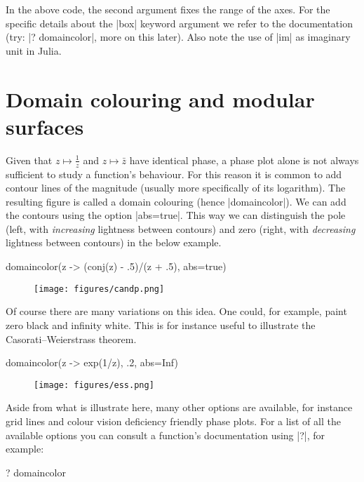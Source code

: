 \documentclass[a4paper]{article}
\begin{document}
In the above code, the second argument fixes the range of the axes. For the
specific details about the \jlv|box| keyword argument we refer to the
documentation (try: \jlv|? domaincolor|, more on this later). Also note the use
of \jlv|im| as imaginary unit in Julia.

\section{Domain colouring and modular surfaces}

Given that $z \mapsto \frac{1}{z}$ and $z \mapsto \bar{z}$ have identical phase,
a phase plot alone is not always sufficient to study a function's behaviour.
For this reason it is common to add contour lines of the magnitude (usually more
specifically of its logarithm). The resulting figure is called a domain
colouring (hence \jlv|domaincolor|). We can add the contours using the option
\jlv|abs=true|. This way we can distinguish the pole (left, with
\emph{increasing} lightness between contours) and zero (right, with
\emph{decreasing} lightness between contours) in the below example.

\begin{juliaverbatim}
	domaincolor(z -> (conj(z) - .5)/(z + .5), abs=true)
\end{juliaverbatim}
\begin{figure}[H]
	\centering
	\texttt{[image: figures/candp.png]}
\end{figure}

Of course there are many variations on this idea. One could, for example, paint
zero black and infinity white. This is for instance useful to illustrate the
Casorati--Weierstrass theorem.

\begin{juliaverbatim}
	domaincolor(z -> exp(1/z), .2, abs=Inf)
\end{juliaverbatim}
\begin{figure}[H]
	\centering
	\texttt{[image: figures/ess.png]}
\end{figure}

Aside from what is illustrate here, many other options are available, for
instance grid lines and colour vision deficiency friendly phase plots. For a
list of all the available options you can consult a function's documentation
using \jlv|?|, for example:

\begin{juliaverbatim}
	? domaincolor
\end{juliaverbatim}
\end{document}
